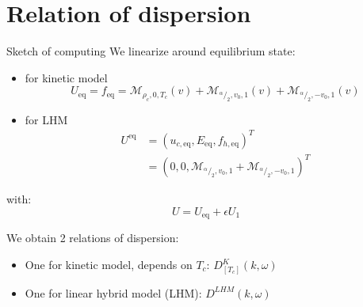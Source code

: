 \documentclass{beamer}
\begin{document}
\section{Relation of dispersion}
\begin{frame}{Sketch of computing}
  We linearize around equilibrium state:
  \begin{itemize}
    \item for kinetic model $$U_\text{eq} = f_\text{eq} = \mathcal{M}_{\rho_c,0,T_c}(v) + \mathcal{M}_{^\alpha/_2,v_0,1}(v) + \mathcal{M}_{^\alpha/_2,-v_0,1}(v)$$
    \item for LHM $$
      \begin{aligned}
        U^\text{eq} &= \left(u_{c,\text{eq}},E_\text{eq},f_{h,\text{eq}}\right)^T \\
                    &= \left(0,0, \mathcal{M}_{^\alpha/_2,v_0,1} + \mathcal{M}_{^\alpha/_2,-v_0,1}\right)^T
      \end{aligned}
    $$
  \end{itemize}
  with:
  $$
    U = U_\text{eq} + \epsilon U_1
  $$

  We obtain 2 relations of dispersion:
  \begin{itemize}
    \item One for kinetic model, depends on $T_c$: $D^K_{[T_c]}(k,\omega)$
    \item One for linear hybrid model (LHM): $D^{LHM}(k,\omega)$
  \end{itemize}
\end{frame}
\end{document}
